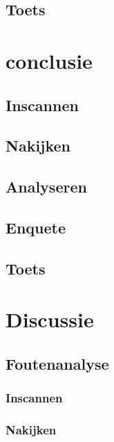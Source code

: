 \documentclass[12pt]{article}
\begin{document}
\begin{minipage}{0.35\linewidth}

\end{minipage}%
\begin{minipage}{0.65\linewidth}


\end{minipage}

\pagebreak
\subsection{Toets}

\pagebreak
\section{conclusie}
\subsection{Inscannen}


\subsection{Nakijken}


\subsection{Analyseren}


\subsection{Enquete}


\subsection{Toets}

\pagebreak
\section{Discussie}
\subsection{Foutenanalyse}
\subsubsection{Inscannen}


\subsubsection{Nakijken}
\end{document}
